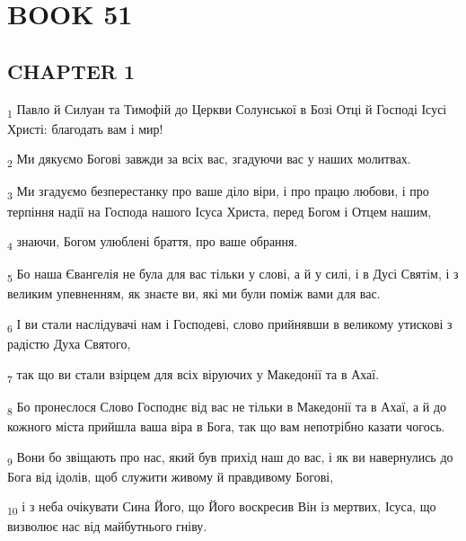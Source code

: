\section{BOOK 51}
\subsection{CHAPTER 1}
\begin{tcolorbox}
\textsubscript{1} Павло й Силуан та Тимофій до Церкви Солунської в Бозі Отці й Господі Ісусі Христі: благодать вам і мир!
\end{tcolorbox}
\begin{tcolorbox}
\textsubscript{2} Ми дякуємо Богові завжди за всіх вас, згадуючи вас у наших молитвах.
\end{tcolorbox}
\begin{tcolorbox}
\textsubscript{3} Ми згадуємо безперестанку про ваше діло віри, і про працю любови, і про терпіння надії на Господа нашого Ісуса Христа, перед Богом і Отцем нашим,
\end{tcolorbox}
\begin{tcolorbox}
\textsubscript{4} знаючи, Богом улюблені браття, про ваше обрання.
\end{tcolorbox}
\begin{tcolorbox}
\textsubscript{5} Бо наша Євангелія не була для вас тільки у слові, а й у силі, і в Дусі Святім, і з великим упевненням, як знаєте ви, які ми були поміж вами для вас.
\end{tcolorbox}
\begin{tcolorbox}
\textsubscript{6} І ви стали наслідувачі нам і Господеві, слово прийнявши в великому утискові з радістю Духа Святого,
\end{tcolorbox}
\begin{tcolorbox}
\textsubscript{7} так що ви стали взірцем для всіх віруючих у Македонії та в Ахаї.
\end{tcolorbox}
\begin{tcolorbox}
\textsubscript{8} Бо пронеслося Слово Господнє від вас не тільки в Македонії та в Ахаї, а й до кожного міста прийшла ваша віра в Бога, так що вам непотрібно казати чогось.
\end{tcolorbox}
\begin{tcolorbox}
\textsubscript{9} Вони бо звіщають про нас, який був прихід наш до вас, і як ви навернулись до Бога від ідолів, щоб служити живому й правдивому Богові,
\end{tcolorbox}
\begin{tcolorbox}
\textsubscript{10} і з неба очікувати Сина Його, що Його воскресив Він із мертвих, Ісуса, що визволює нас від майбутнього гніву.
\end{tcolorbox}
